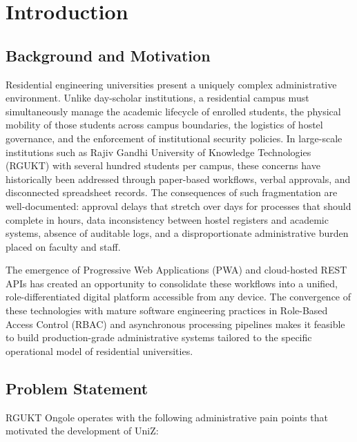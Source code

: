 \documentclass[12pt,a4paper]{report}
\begin{document}
\newpage\tableofcontents
\newpage\listoffigures
\newpage\listoftables

\newpage{}\setcounter{page}{1}

\chapter{Introduction}

\section{Background and Motivation}

Residential engineering universities present a uniquely complex administrative environment. Unlike day-scholar institutions, a residential campus must simultaneously manage the academic lifecycle of enrolled students, the physical mobility of those students across campus boundaries, the logistics of hostel governance, and the enforcement of institutional security policies. In large-scale institutions such as Rajiv Gandhi University of Knowledge Technologies (RGUKT) with several hundred students per campus, these concerns have historically been addressed through paper-based workflows, verbal approvals, and disconnected spreadsheet records. The consequences of such fragmentation are well-documented: approval delays that stretch over days for processes that should complete in hours, data inconsistency between hostel registers and academic systems, absence of auditable logs, and a disproportionate administrative burden placed on faculty and staff.

The emergence of Progressive Web Applications (PWA) and cloud-hosted REST APIs has created an opportunity to consolidate these workflows into a unified, role-differentiated digital platform accessible from any device. The convergence of these technologies with mature software engineering practices in Role-Based Access Control (RBAC) and asynchronous processing pipelines makes it feasible to build production-grade administrative systems tailored to the specific operational model of residential universities.

\section{Problem Statement}

RGUKT Ongole operates with the following administrative pain points that motivated the development of UniZ:
\end{document}
